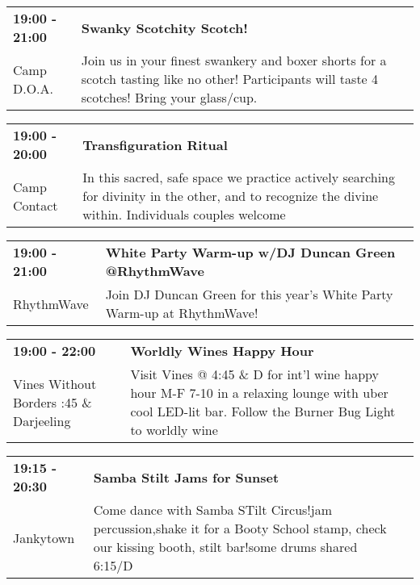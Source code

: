 \begin{tabular}{ p{1in} p{2.2in} }
    \textbf{19:00 - 21:00} & \textbf{Swanky Scotchity Scotch!} \\
    Camp D.O.A. \newline  & Join us in your finest swankery and boxer shorts for a scotch tasting like no other! Participants will taste 4 scotches! Bring your glass/cup. \\
    \hline 
\end{tabular}
    
\begin{tabular}{ p{1in} p{2.2in} }
    \textbf{19:00 - 20:00} & \textbf{Transfiguration Ritual} \\
    Camp Contact \newline  & In this sacred, safe space we practice actively searching for divinity in the other, and to recognize the divine within. Individuals   couples welcome \\
    \hline 
\end{tabular}
    
\begin{tabular}{ p{1in} p{2.2in} }
    \textbf{19:00 - 21:00} & \textbf{White Party Warm-up w/DJ Duncan Green @RhythmWave} \\
    RhythmWave \newline  & Join DJ Duncan Green for this year's White Party Warm-up at RhythmWave! \\
    \hline 
\end{tabular}
    
\begin{tabular}{ p{1in} p{2.2in} }
    \textbf{19:00 - 22:00} & \textbf{Worldly Wines Happy Hour} \\
    Vines Without Borders \newline 4:45 \& Darjeeling & Visit Vines @ 4:45 \& D for int'l wine happy hour M-F 7-10 in a relaxing lounge with uber cool LED-lit bar. Follow the Burner Bug Light to worldly wine \\
    \hline 
\end{tabular}
    
\begin{tabular}{ p{1in} p{2.2in} }
    \textbf{19:15 - 20:30} & \textbf{Samba Stilt Jams for Sunset} \\
    Jankytown \newline  & Come dance with Samba STilt Circus!jam percussion,shake it for a Booty School stamp, check our kissing booth, stilt bar!some drums shared~ 6:15/D \\
    \hline 
\end{tabular}
    
